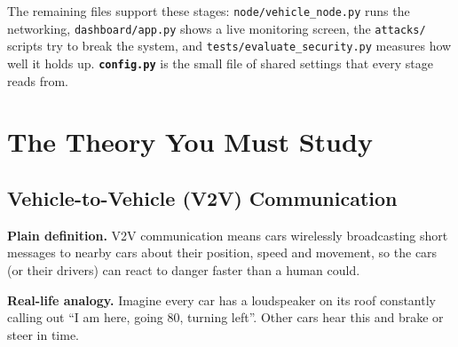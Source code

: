 \documentclass[11pt,a4paper]{article}
\begin{document}
\noindent The remaining files support these stages: \texttt{node/vehicle\_node.py}
runs the networking, \texttt{dashboard/app.py} shows a live monitoring screen,
the \texttt{attacks/} scripts try to break the system, and
\texttt{tests/evaluate\_security.py} measures how well it holds up.
\textbf{\texttt{config.py}} is the small file of shared settings that every
stage reads from.

\begin{center}
\end{center}

\section{The Theory You Must Study}

\subsection{Vehicle-to-Vehicle (V2V) Communication}
\textbf{Plain definition.} V2V communication means cars wirelessly broadcasting
short messages to nearby cars about their position, speed and movement, so the
cars (or their drivers) can react to danger faster than a human could.

\textbf{Real-life analogy.} Imagine every car has a loudspeaker on its roof
constantly calling out ``I am here, going 80, turning left''. Other cars hear
this and brake or steer in time.
\end{document}
